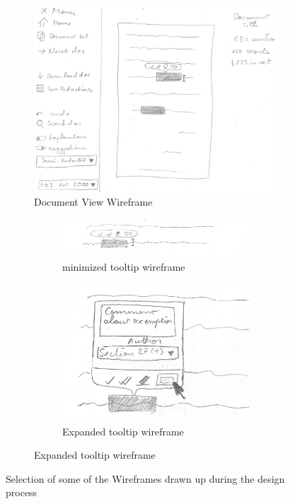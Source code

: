 \documentclass{l4proj}
\begin{document}
\begin{figure}[H]
    \centering
    \begin{subfigure}[b]{\linewidth}
        \centering
        \includegraphics[width=0.6\linewidth]{images/wireframes/doc_view.jpg}
        \caption{Document View Wireframe}
        \label{fig:document-wireframe}
    \end{subfigure}
    \begin{subfigure}[b]{\linewidth}
        \begin{subfigure}[b]{0.5\linewidth}
            \includegraphics[width=\linewidth]{images/wireframes/tooltip.jpg}
            \caption{minimized tooltip wireframe}
            \label{fig:tooltip-wireframe}
        \end{subfigure}
        \begin{subfigure}[b]{0.4\linewidth}
            \includegraphics[width=\linewidth]{images/wireframes/tooltip_comment.jpg}
            \caption{Expanded tooltip wireframe}
            \label{fig:expanded-tooltip-wireframe}
        \end{subfigure}
    \end{subfigure}
    \caption{Selection of some of the Wireframes drawn up during the design process}
    \label{fig:wireframes}

\end{figure}
\end{document}
